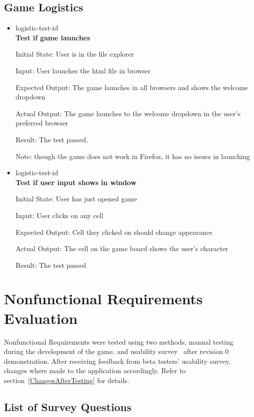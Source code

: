 \documentclass[12pt, titlepage]{article}
\newcounter{GLnum}
\newcommand{\ttheGLnum}{logistic-test-id \theGLnum}
\begin{document}
\subsection{Game Logistics}

\begin{itemize}

\item {\ttheGLnum \label{GLtest1}\\}
\textbf{Test if game launches}
					
Initial State: User is in the file explorer
					
Input: User launches the html file in browser
					
Expected Output: The game launches in all browsers and shows the welcome dropdown

Actual Output: The game launches to the welcome dropdown in the user's preferred browser

Result: The test passed. 

Note: though the game does not work in Firefox, it has no issues in launching

\item {\ttheGLnum \label{GLtest2}\\}
\textbf{Test if user input shows in window}
					
Initial State: User has just opened game
					
Input: User clicks on any cell
					
Expected Output: Cell they clicked on should change appearance

Actual Output: The cell on the game board shows the user's character

Result: The test passed

\end{itemize}

\section{Nonfunctional Requirements Evaluation}
Nonfunctional Requirements were tested using two methods, manual testing during the 
development of the game, and usability survey~\citep{survey} after revision 0 demonstration. After receiving feedback from beta testers' usability survey, changes where made to the application accordingly. Refer to section~\ref{ChangesAfterTesting} for details.

\subsection* {List of Survey Questions} \label{ListQuestions}
\end{document}
